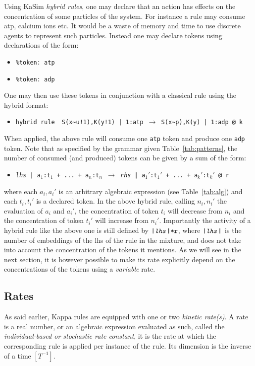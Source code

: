\documentclass[11pt]{book}
\def\int{\hbox{\texttt{\~}}}
\def\ttt#1{\texttt{#1}}
\def\var#1{\textquotesingle #1\textquotesingle}
\def\rar{\rightarrow}
\def\ITE#1{\begin{itemize}#1\end{itemize}}
\def\imp#1{\emph{#1}\index{#1}}
\begin{document}
Using KaSim \imp{hybrid rules}, one may declare that an action has effects on the concentration of some particles of the system. For instance a rule may consume atp, calcium ions etc. It would be a waste of memory and time to use discrete agents to represent such particles. Instead one may declare tokens using declarations of the form:
\ITE{
\item[] \ttt{\%token: atp} 
\item[] \ttt{\%token: adp} 
}
One may then use these tokens in conjunction with a classical rule using the hybrid format:
\ITE{
\item[] \ttt{\var{hybrid rule}~ S(x\int u!1),K(y!1)\ |\ 1:atp $\rar$ S(x\int p),K(y)\ |\ 1:adp\ @ \var{k}} 
}
When applied, the above rule will consume one \ttt{atp} token and produce one \ttt{adp} token. Note that as specified by the grammar given Table~\ref{tab:patterns}, the number of consumed (and produced) tokens can be given by a sum of the form:
\ITE{
\item[] \ttt{\textit{lhs} | a$_1$:t$_1$ + ... + a$_n$:t$_n$ $\rar$ \textit{rhs} | a$_1'$:t$_1'$ + ... + a$_k'$:t$_k'$ @ r} 
}
where each $a_i,a_i'$ is an arbitrary algebraic expression (see Table~\ref{tab:alg}) and each $t_i,t_i'$ is a declared token. In the above hybrid rule, calling $n_i,n_i'$  the evaluation of $a_i$ and $a_i'$, the concentration of token $t_i$ will decrease from $n_i$ and the concentration of token $t_i'$ will increase from $n_i'$. Importantly the activity of a hybrid rule like the above one is still 
defined by $\ttt{|\textit{lhs}|*r}$, where $\ttt{|\textit{lhs}|}$ is the number of embeddings of the lhs of the rule in the mixture, and does not take into account the concentration of the tokens it mentions. As we will see in the next section, it is however possible to make its rate explicitly depend on the concentrations of the tokens using a \imp{variable} rate.

\subsection{Rates}\label{sec:kinetics}
As said earlier, Kappa rules are equipped with one or two \emph{kinetic rate(s)}. A rate is a real number, or an algebraic expression evaluated as such, called the \emph{individual-based or stochastic rate constant}, it is the rate at which the corresponding rule is applied per instance of the rule. Its dimension is the inverse of a time $[T^{-1}]$.
\end{document}
